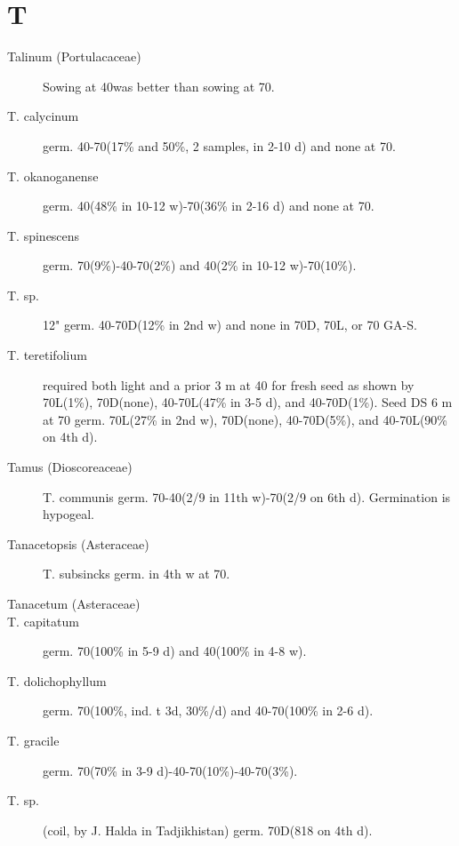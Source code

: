 \section{T}
\begin{description}
\item[Talinum (Portulacaceae)] Sowing at 40was better than sowing at 70.
\item[T. calycinum] germ. 40-70(17\% and 50\%, 2 samples, in 2-10 d) and none at 70.
\item[T. okanoganense] germ. 40(48\% in 10-12 w)-70(36\% in 2-16 d) and none at 70.
\item[T. spinescens] germ. 70(9\%)-40-70(2\%) and 40(2\% in 10-12 w)-70(10\%).
\item[T. sp.] 12" germ. 40-70D(12\% in 2nd w) and none in 70D, 70L, or 70 GA-S.
\item[T. teretifolium] required both light and a prior 3 m at 40 for fresh seed as shown
by 70L(1\%), 70D(none), 40-70L(47\% in 3-5 d), and 40-70D(1\%). Seed DS 6 m at 70
germ. 70L(27\% in 2nd w), 70D(none), 40-70D(5\%), and 40-70L(90\% on 4th d).

\item[Tamus (Dioscoreaceae)] T. communis germ. 70-40(2/9 in 11th w)-70(2/9
on 6th d). Germination is hypogeal.
\item[Tanacetopsis (Asteraceae)] T. subsincks germ. in 4th w at 70.
\item[Tanacetum (Asteraceae)]
\item[T. capitatum] germ. 70(100\% in 5-9 d) and 40(100\% in 4-8 w).
\item[T. dolichophyllum] germ. 70(100\%, ind. t 3d, 30\%/d) and 40-70(100\% in 2-6 d).
\item[T. gracile] germ. 70(70\% in 3-9 d)-40-70(10\%)-40-70(3\%).
\item[T. sp.] (coil, by J. Halda in Tadjikhistan) germ. 70D(818 on 4th d).


\end{description}
